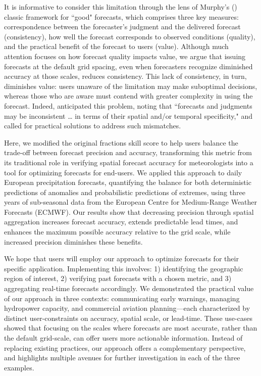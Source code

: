 \documentclass[preprint,12pt,authoryear]{elsarticle}
\begin{document}
 
It is informative to consider this limitation through the lens of Murphy's (\citeyear{Murphy1993}) classic framework for ``good" forecasts, which comprises three key measures: correspondence between the forecaster’s judgment and the delivered forecast (consistency), how well the forecast corresponds to observed conditions (quality), and the practical benefit of the forecast to users (value). Although much attention focuses on how forecast quality impacts value, we argue that issuing forecasts at the default grid spacing, even when forecasters recognize diminished accuracy at those scales, reduces consistency. This lack of consistency, in turn, diminishes value: users unaware of the limitation may make suboptimal decisions, whereas those who are aware must contend with greater complexity in using the forecast. Indeed, \cite{Murphy1993} anticipated this problem, noting that ``forecasts and judgments may be inconsistent … in terms of their spatial and/or temporal specificity," and called for practical solutions to address such mismatches.




 
Here, we modified the original fractions skill score to help users balance the trade-off between forecast precision and accuracy, transforming this metric from its traditional role in verifying spatial forecast accuracy for meteorologists into a tool for optimizing forecasts for end-users. We applied this approach to daily European precipitation forecasts, quantifying the balance for both deterministic predictions of anomalies and probabilistic predictions of extremes, using three years of sub-seasonal data from the European Centre for Medium-Range Weather Forecasts (ECMWF). Our results show that decreasing precision through spatial aggregation increases forecast accuracy, extends predictable lead times, and enhances the maximum possible accuracy relative to the grid scale, while increased precision diminishes these benefits. 


We hope that users will employ our approach to optimize forecasts for their specific application. Implementing this involves: 1) identifying the geographic region of interest, 2) verifying past forecasts with a chosen metric, and 3) aggregating real-time forecasts accordingly. We demonstrated the practical value of our approach in three contexts: communicating early warnings, managing hydropower capacity, and commercial aviation planning—each characterized by distinct user-constraints on accuracy, spatial scale, or lead-time. These use-cases showed that focusing on the scales where forecasts are most accurate, rather than the default grid-scale, can offer users more actionable information. Instead of replacing existing practices, our approach offers a complementary perspective, and highlights multiple avenues for further investigation in each of the three examples.
\end{document}
